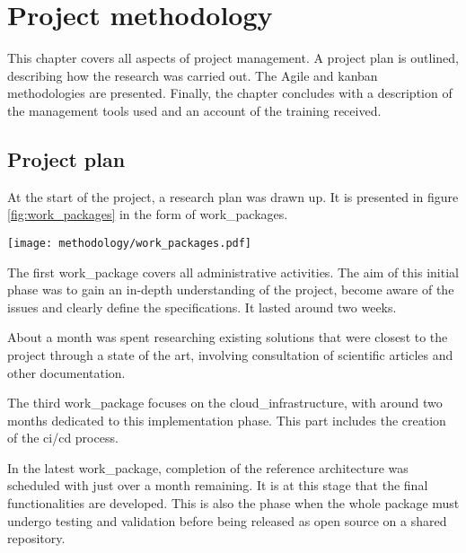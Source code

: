 

\chapter{Project methodology}
\label{chap:methodology}

This chapter covers all aspects of project management. A project plan is outlined, describing how the research was carried out. The Agile and \gls{kanban} methodologies are presented. Finally, the chapter concludes with a description of the management tools used and an account of the training received.

\minitoc
\newpage

\section{Project plan}

At the start of the project, a research plan was drawn up. It is presented in figure \ref{fig:work_packages} in the form of \glspl{work_package}.
\begin{center}
    \begingroup
    \texttt{[image: methodology/work\_packages.pdf]}
    \label{fig:work_packages}
    \endgroup
\end{center}
The first \gls{work_package} covers all administrative activities. The aim of this initial phase was to gain an in-depth understanding of the project, become aware of the issues and clearly define the specifications. It lasted around two weeks.

About a month was spent researching existing solutions that were closest to the project through a state of the art, involving consultation of scientific articles and other documentation.

The third \gls{work_package} focuses on the \gls{cloud_infrastructure}, with around two months dedicated to this implementation phase. This part includes the creation of the \acrshort{ci}/\acrshort{cd} process.

In the latest \gls{work_package}, completion of the reference architecture was scheduled with just over a month remaining. It is at this stage that the final functionalities are developed. This is also the phase when the whole package must undergo testing and validation before being released as open source on a shared repository.


